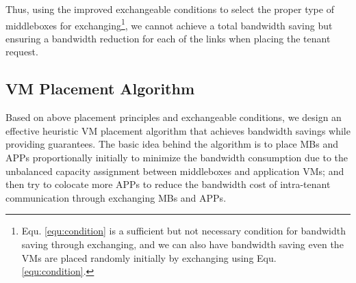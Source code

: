 \documentclass[review]{elsarticle}
\begin{document}
Thus, using the improved exchangeable conditions to select the proper type of middleboxes for exchanging\footnote{Equ. \ref{equ:condition} is a sufficient but not necessary condition for bandwidth saving through exchanging, and we can also have bandwidth saving even the VMs are placed randomly initially by exchanging using Equ. \ref{equ:condition}.},
we cannot achieve a total bandwidth saving but ensuring a bandwidth reduction for each of the links when placing the tenant request.


\subsection{VM Placement Algorithm}

Based on above placement principles and exchangeable conditions, we design an effective heuristic VM placement algorithm that achieves bandwidth savings while providing guarantees. The basic idea behind the algorithm is to place MBs and APPs proportionally initially to minimize the bandwidth consumption due to the unbalanced capacity assignment between middleboxes and application VMs; and then try to colocate more APPs to reduce the bandwidth cost of intra-tenant communication through exchanging MBs and APPs. 
\end{document}
